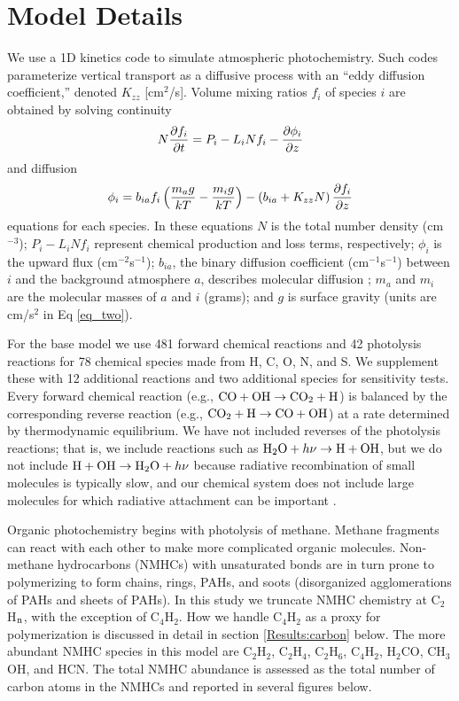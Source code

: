 \documentclass[preprint]{aastex}
\newcounter{reaction}
\begin{document}
\section{Model Details}

We use a 1D kinetics code to simulate atmospheric photochemistry. 
Such codes parameterize vertical transport as a diffusive process 
with an ``eddy diffusion coefficient,'' denoted $K_{zz}$ [cm$^2$/s].
Volume mixing ratios $f_i$ of species $i$ are obtained by solving continuity
\begin{equation}
\label{eq_one}
N{\partial f_i \over \partial t} = P_i - L_i N f_i - {\partial \phi_i \over \partial z} 
\end{equation}
\noindent and diffusion
\begin{equation}
\label{eq_two}
\phi_i = b_{ia} f_i \left( {m_a g\over kT} - {m_i g\over kT}\right) - \left( b_{ia} + K_{zz}N\right) {\partial f_i \over \partial z}
\end{equation}
\noindent equations for each species.
In these equations $N$ is the total number density (cm$^{-3}$);
$P_i - L_i N f_i$ represent chemical production and loss terms, respectively;
$\phi_i$ is the upward flux (cm$^{-2}$s$^{-1}$); $b_{ia}$, the binary diffusion coefficient (cm$^{-1}$s$^{-1}$) between $i$ and the background atmosphere $a$, describes molecular diffusion ; $m_a$ and $m_i$ are the molecular masses of $a$ and $i$ (grams); {\color{red} and $g$ is surface gravity (units are cm/s$^{2}$ in Eq \ref{eq_two}).}
 
For the base model we use 481 forward chemical reactions and 42 photolysis reactions for 78 chemical species made from H, C, O, N, and S.
We supplement these with 12 additional reactions and two additional species for sensitivity tests. %
Every forward chemical reaction (e.g., ${\rm CO} + {\rm OH} \rightarrow {\rm CO}_2 + {\rm H}$) is balanced by the corresponding reverse reaction (e.g., ${\rm CO}_2 + {\rm H} \rightarrow  {\rm CO} + {\rm OH} $) at a rate determined by thermodynamic equilibrium.
 We have not included reverses of the photolysis reactions; that is, we include reactions such as 
 ${\rm H}_2{\rm O} + h\nu \rightarrow  {\rm H} + {\rm OH} $, but we do not include
 ${\rm H} + {\rm OH} \rightarrow {\rm H}_2{\rm O} + h\nu$ because radiative recombination of small
 molecules is typically slow, and our chemical system does not include large molecules for which radiative attachment can
 be important \citep{Vuitton2012}.

Organic photochemistry begins with photolysis of methane.  Methane fragments can react with each other
to make more complicated organic molecules.
Non-methane hydrocarbons (NMHCs) with unsaturated bonds are in turn prone to polymerizing to form chains, rings, 
PAHs, and soots (disorganized agglomerations of PAHs and sheets of PAHs).
In this study we truncate NMHC chemistry at C$_2$H$_{\rm n}$, with the exception of C$_4$H$_2$.
How we handle C$_4$H$_2$ as a proxy for polymerization is discussed in detail in section \ref{Results:carbon} below. 
The more abundant NMHC species in this model are C$_2$H$_2$, C$_2$H$_4$, C$_2$H$_6$, C$_4$H$_2$,
H$_2$CO, CH$_3$OH, and HCN.  
The total NMHC abundance is assessed as the total number of carbon atoms in the NMHCs and reported in several figures below.
\end{document}
